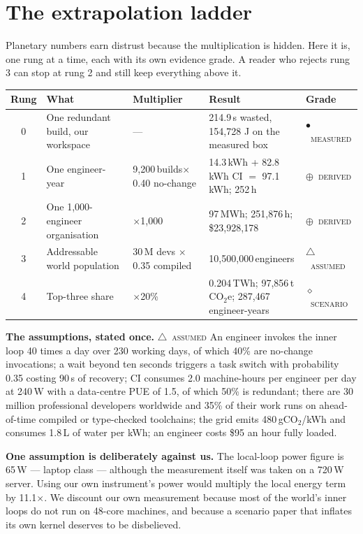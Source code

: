\documentclass[11pt,a4paper]{article}
\newcommand{\stM}{\textcolor{sigilcyan}{$\bullet$}~{\scriptsize\textsc{measured}}}
\newcommand{\stD}{\textcolor{sigilviolet}{$\oplus$}~{\scriptsize\textsc{derived}}}
\newcommand{\stA}{\textcolor{sigilamber}{$\triangle$}~{\scriptsize\textsc{assumed}}}
\newcommand{\stC}{\textcolor{sigilred}{$\diamond$}~{\scriptsize\textsc{scenario}}}
\begin{document}
\section{The extrapolation ladder}\label{sec:ladder}


Planetary numbers earn distrust because the multiplication is hidden. Here it is, one rung at a time, each with its own evidence grade. A reader who rejects rung 3 can stop at rung 2 and still keep everything above it.


\begin{center}\small{}\begin{tabularx}{\textwidth}{@{}cXXXl@{}}\toprule
Rung & What & Multiplier & Result & Grade \\\midrule
0 & One redundant build, our workspace & --- & 214.9\,s wasted, 154{,}728 J on the measured box & \stM \\
1 & One engineer-year & 9{,}200\,builds$\times$0.40 no-change & 14.3\,kWh + 82.8\,kWh CI $=$ 97.1\,kWh; 252\,h & \stD \\
2 & One 1{,}000-engineer organisation & $\times$1{,}000 & 97\,MWh; 251{,}876\,h; \$23{,}928{,}178 & \stD \\
3 & Addressable world population & 30\,M devs $\times$0.35 compiled & 10{,}500{,}000\,engineers & \stA \\
4 & Top-three share & $\times$20\% & 0.204\,TWh; 97{,}856\,t\,CO$_2$e; 287{,}467\,engineer-years & \stC \\
\bottomrule\end{tabularx}\end{center}


\textbf{The assumptions, stated once.} \stA{} An engineer invokes the inner loop 40 times a day over 230 working days, of which 40\% are no-change invocations; a wait beyond ten seconds triggers a task switch with probability 0.35 costing 90\,s of recovery; CI consumes 2.0 machine-hours per engineer per day at 240\,W with a data-centre PUE of 1.5, of which 50\% is redundant; there are 30 million professional developers worldwide and 35\% of their work runs on ahead-of-time compiled or type-checked toolchains; the grid emits 480\,gCO$_2$/kWh and consumes 1.8\,L of water per kWh; an engineer costs \$95 an hour fully loaded.

\textbf{One assumption is deliberately against us.} The local-loop power figure is 65\,W --- laptop class --- although the measurement itself was taken on a 720\,W server. Using our own instrument's power would multiply the local energy term by 11.1$\times$. We discount our own measurement because most of the world's inner loops do not run on 48-core machines, and because a scenario paper that inflates its own kernel deserves to be disbelieved.
\end{document}
